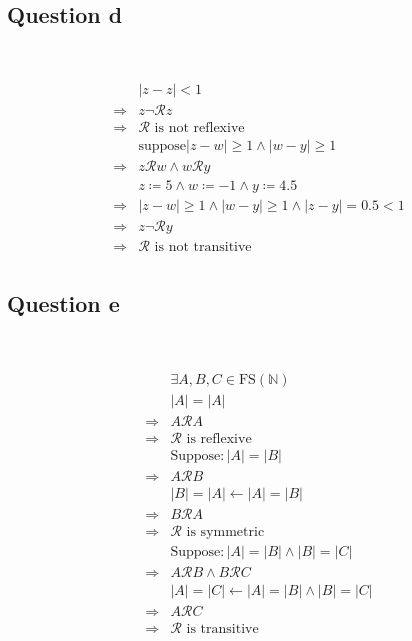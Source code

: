\documentclass{article}
\begin{document}
~

\subsection*{Question d}

~

\begin{equation*}
    \begin{split}
        &|z-z|<1\\
        \Rightarrow&z\lnot\mathcal{R}z\\
        \Rightarrow&\mathcal{R}\text{ is not reflexive}\\
        &\text{suppose}|z-w|\geqslant 1\land|w-y|\geqslant 1\\
        \Rightarrow&z\mathcal{R}w\land w\mathcal{R}y\\
        &z\coloneqq 5\land w\coloneqq-1\land y\coloneqq4.5\\
        \Rightarrow&|z-w|\geqslant 1\land|w-y|\geqslant 1\land|z-y|=0.5<1\\
        \Rightarrow&z\lnot\mathcal{R}y\\
        \Rightarrow&\mathcal{R}\text{ is not transitive}\\
    \end{split}
\end{equation*}

\subsection*{Question e}

~

\begin{equation*}
    \begin{split}
        &\exists A,B,C\in \text{FS}(\mathbb{N} )\\
        &|A|=|A|\\
        \Rightarrow&A\mathcal{R} A\\
        \Rightarrow&\mathcal{R} \text{ is reflexive}\\
        &\text{Suppose}:|A|=|B|\\
        \Rightarrow&A\mathcal{R}B\\
        &|B|=|A|\leftarrow |A|=|B|\\
        \Rightarrow&B\mathcal{R}A\\
        \Rightarrow&\mathcal{R}\text{ is symmetric}\\
        &\text{Suppose}:|A|=|B|\land|B|=|C|\\
        \Rightarrow&A\mathcal{R}B\land B\mathcal{R}C\\
        &|A|=|C|\leftarrow |A|=|B|\land|B|=|C|\\
        \Rightarrow&A\mathcal{R}C\\
        \Rightarrow&\mathcal{R}\text{ is transitive}\\
    \end{split}
\end{equation*}
\end{document}
